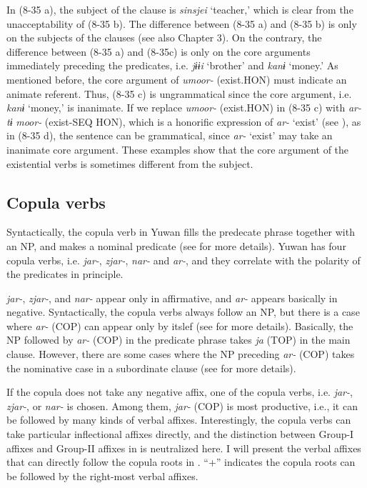 In (8-35 a), the subject of the clause is \textit{sinsjei} ‘teacher,’ which is clear from the unacceptability of (8-35 b). The difference between (8-35 a) and (8-35 b) is only on the subjects of the clauses (see also Chapter 3). On the contrary, the difference between (8-35 a) and (8-35c) is only on the core arguments immediately preceding the predicates, i.e. \textit{jɨɨi} ‘brother’ and \textit{kanɨ} ‘money.’ As mentioned before, the core argument of \textit{umoor-} (exist.HON) must indicate an animate referent. Thus, (8-35 c) is ungrammatical since the core argument, i.e. \textit{kanɨ} ‘money,’ is inanimate. If we replace \textit{umoor-} (exist.HON) in (8-35 c) with \textit{ar-tɨ} \textit{moor-} (exist-SEQ HON), which is a honorific expression of \textit{ar-} ‘exist’ (see ), as in (8-35 d), the sentence can be grammatical, since \textit{ar-} ‘exist’ may take an inanimate core argument. These examples show that the core argument of the existential verbs is sometimes different from the subject.

\subsection{Copula verbs}

Syntactically, the copula verb in Yuwan fills the predecate phrase together with an NP, and makes a nominal predicate (see  for more details). Yuwan has four copula verbs, i.e. \textit{jar-}, \textit{zjar-}, \textit{nar-} and \textit{ar-}, and they correlate with the polarity of the predicates in principle.

  \textit{jar-}, \textit{zjar-}, and \textit{nar-} appear only in affirmative, and \textit{ar-} appears basically in negative. Syntactically, the copula verbs always follow an NP, but there is a case where \textit{ar-} (COP) can appear only by itslef (see  for more details). Basically, the NP followed by \textit{ar-} (COP) in the predicate phrase takes \textit{ja} (TOP) in the main clause. However, there are some cases where the NP preceding \textit{ar-} (COP) takes the nominative case in a subordinate clause (see  for more details).

  If the copula does not take any negative affix, one of the copula verbs, i.e. \textit{jar-}, \textit{zjar-}, or \textit{nar-} is chosen. Among them, \textit{jar-} (COP) is most productive, i.e., it can be followed by many kinds of verbal affixes. Interestingly, the copula verbs can take particular inflectional affixes directly, and the distinction between Group-I affixes and Group-II affixes in  is neutralized here. I will present the verbal affixes that can directly follow the copula roots in . “+” indicates the copula roots can be followed by the right-most verbal affixes.

